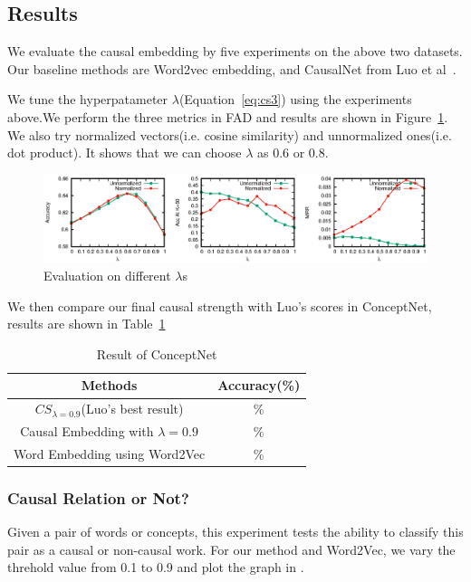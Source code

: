 \subsection{Results}
We evaluate the causal embedding by five experiments on the above two
datasets. Our baseline methods are Word2vec embedding, and CausalNet
from Luo et al~.

We tune the hyperpatameter $\lambda$(Equation~\ref{eq:cs3}) using the experiments above.We perform the three metrics in FAD and results are shown in Figure~\ref{fig:lambda}. 
We also try normalized vectors(i.e. cosine similarity) and unnormalized ones(i.e. dot product).
It shows that we can choose $\lambda$ as 0.6 or 0.8.


\begin{figure}[th]
	\centering
	\includegraphics[width=2\columnwidth]{figure/lambda}
	\caption{Evaluation on different $\lambda$s}
	\label{fig:lambda}
\end{figure}

We then compare our final causal strength with Luo's scores in ConceptNet, results are shown in Table~\ref{tab:conceptnet}

\begin{table}[th]
	\centering
	\caption{Result of ConceptNet}
	\begin{tabular}{cc}
		\hline
		Methods & Accuracy(\%) \\
		\hline
		$CS_{\lambda=0.9}$(Luo's best result) & \%  \\
		Causal Embedding with $\lambda=0.9$ & \%  \\
		Word Embedding using Word2Vec & \%  \\
		\hline
	\end{tabular}
	\label{tab:conceptnet}
\end{table}


\subsubsection{Causal Relation or Not?}
Given a pair of words or concepts, this experiment tests the ability
to classify this pair as a causal or non-causal work. For our method
and Word2Vec, we vary the threhold value from 0.1 to 0.9 and plot
the graph in .

